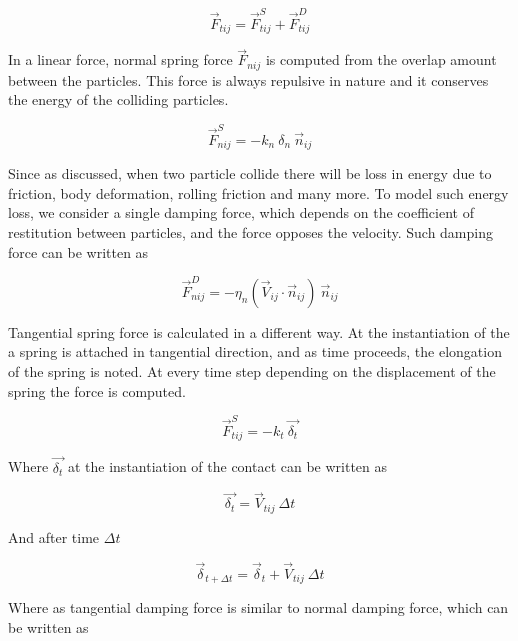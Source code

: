\begin{equation}
  \label{eq:tangential_force}
  \vec{F}_{tij} =  \vec{F}_{tij}^S +  \vec{F}_{tij}^D
\end{equation}

In a linear force, normal spring force $\vec{F}_{nij}$ is computed from the overlap
amount between the particles. This force is always repulsive in nature
and it conserves the energy of the colliding particles.

\begin{equation}
  \label{eq:normal_spring_force}
  \vec{F}_{nij}^S = -k_n \> \delta_n \> \vec{n}_{ij}
\end{equation}

Since as discussed, when two particle collide there will be loss in
energy due to friction, body deformation, rolling friction and many
more. To model such energy loss, we consider a single damping force,
which depends on the coefficient of restitution between particles, and
the force opposes the velocity. Such damping force can be written as

\begin{equation}
  \label{eq:normal_damping_force}
  \vec{F}_{nij}^D = -\eta_n  (\vec{V}_{ij} \cdot \vec{n}_{ij}) \> \vec{n}_{ij}
\end{equation}


Tangential spring force is calculated in a different way. At the
instantiation of the a spring is attached in tangential direction, and
as time proceeds, the elongation of the spring is noted. At every time
step depending on the displacement of the spring the force is
computed.

\begin{equation}
  \label{eq:tang_spring_force}
  \vec{F}_{tij}^S = -k_t \> \vec{\delta_t}
\end{equation}

Where $ \vec{\delta_t} $ at the instantiation of the contact
can be written as

\begin{equation}
  \label{eq:tang_disp}
 \vec{\delta_t} = \vec{V}_{tij} \> \Delta t
\end{equation}

And after time $\Delta t$

\begin{equation}
  \label{eq:tang_disp}
 \vec{\delta}_{t + \Delta t} = \vec{\delta}_{t} + \vec{V}_{tij} \> \Delta t
\end{equation}

Where as tangential damping force is similar to normal damping force, which can be
written as

